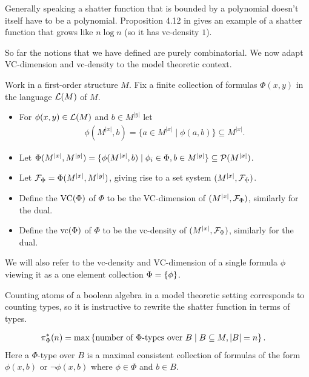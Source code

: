 Generally speaking a shatter function that is bounded by a polynomial doesn't itself have to be a polynomial.
Proposition 4.12 in \cite{density} gives an example of a shatter function that grows like $n \log n$ (so it has vc-density $1$).

So far the notions that we have defined are purely combinatorial.
We now adapt VC-dimension and vc-density to the model theoretic context.

\begin{Definition}
  Work in a first-order structure $M$.
  Fix a finite collection of formulas $\Phi(x, y)$ in the language $\mathcal L(M)$ of $M$.

  \begin{itemize}
  \item For $\phi(x, y) \in \mathcal L(M)$ and $b \in M^{|y|}$ let 
    \begin{align*}
      \phi(M^{|x|}, b) = \{a \in M^{|x|} \mid \phi(a, b)\} \subseteq M^{|x|}.
    \end{align*}
  \item Let $\Phi(M^{|x|}, M^{|y|})= \{\phi(M^{|x|}, b) \mid \phi_i \in \Phi, b \in M^{|y|}\} \subseteq \mathcal P(M^{|x|})$.
  \item Let $\mathcal F_\Phi = \Phi(M^{|x|}, M^{|y|})$, giving rise to a set system $(M^{|x|}, \mathcal F_\Phi)$.
  \item Define the  $\operatorname{VC}(\Phi)$ of $\Phi$ to be the VC-dimension of $(M^{|x|}, \mathcal F_\Phi)$, similarly for the dual.
  \item Define the  $\operatorname{vc}(\Phi)$ of $\Phi$ to be the vc-density of $(M^{|x|}, \mathcal F_\Phi)$, similarly for the dual.
  \end{itemize}

  We will also refer to the vc-density and VC-dimension of a single formula $\phi$
  viewing it as a one element collection $\Phi = \left\{\phi\right\}$.
\end{Definition}

Counting atoms of a boolean algebra in a model theoretic setting corresponds to counting types,
so it is instructive to rewrite the shatter function in terms of types.

\begin{Definition} 
  \begin{align*}
    \pi^*_\Phi(n) &= \max \left\{\text{number of $\Phi$-types over $B$} \mid B \subseteq M, |B| = n\right\}.
  \end{align*}
  Here a $\Phi$-type over $B$ is a maximal consistent collection of formulas of the form $\phi(x, b)$ or $\neg\phi(x, b)$
  where $\phi \in \Phi$ and $b \in B$.
\end{Definition}

